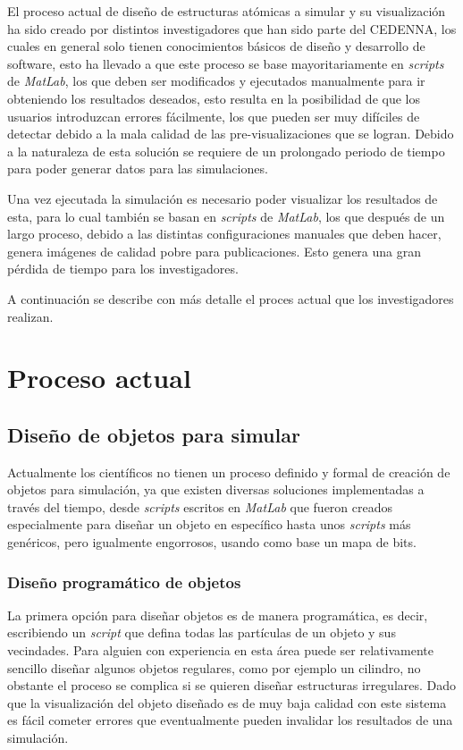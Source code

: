 El proceso actual de diseño de estructuras atómicas a simular y su visualización ha sido creado por distintos investigadores que han sido parte del CEDENNA, los cuales en general solo tienen conocimientos básicos de diseño y desarrollo de software, esto ha llevado a que este proceso se base mayoritariamente en \emph{scripts} de \emph{MatLab}, los que deben ser modificados y ejecutados manualmente para ir obteniendo los resultados deseados, esto resulta en la posibilidad de que los usuarios introduzcan errores fácilmente, los que pueden ser muy difíciles de detectar debido a la mala calidad de las pre-visualizaciones que se logran. Debido a la naturaleza de esta solución se requiere de un prolongado periodo de tiempo para poder generar datos para las simulaciones.

Una vez ejecutada la simulación es necesario poder visualizar los resultados de esta, para lo cual también se basan en \emph{scripts} de \emph{MatLab}, los que después de un largo proceso, debido a las distintas configuraciones manuales que deben hacer, genera imágenes de calidad pobre para publicaciones. Esto genera una gran pérdida de tiempo para los investigadores.

A continuación se describe con más detalle el proces actual que los investigadores realizan.


\section{Proceso actual}

\subsection{Diseño de objetos para simular}

Actualmente los científicos no tienen un proceso definido y formal de creación de objetos para simulación, ya que existen diversas soluciones implementadas a través del tiempo, desde \emph{scripts} escritos en \emph{MatLab} que fueron creados especialmente para diseñar un objeto en específico hasta unos \emph{scripts} más genéricos, pero igualmente engorrosos, usando como base un mapa de bits.


\subsubsection{Diseño programático de objetos}

La primera opción para diseñar objetos es de manera programática, es decir, escribiendo un \emph{script} que defina todas las partículas de un objeto y sus vecindades. Para alguien con experiencia en esta área puede ser relativamente sencillo diseñar algunos objetos regulares, como por ejemplo un cilindro, no obstante el proceso se complica si se quieren diseñar estructuras irregulares. Dado que la visualización del objeto diseñado es de muy baja calidad con este sistema es fácil cometer errores que eventualmente pueden invalidar los resultados de una simulación.


